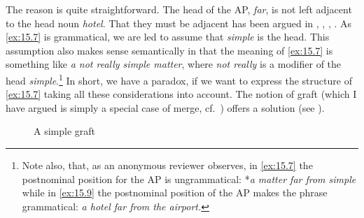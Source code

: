 \documentclass[output=paper]{langsci/langscibook}
\begin{document}
\begin{refcontext}
\label{ex:15.9}
\z
The reason is quite straightforward. The head of the AP, \textit{far}, is not left
adjacent to the head noun \textit{hotel}. That they must be adjacent has been argued
in \citet{Emonds1985,Emonds1976}, \citet{Williams1982},
\citet{VanRiemsdijk1993}, \citet{BibHolRob2014}. As \eqref{ex:15.7} is grammatical, we are
led to assume that \textit{simple} is the head. This assumption also makes sense
semantically in that the meaning of \eqref{ex:15.7} is something like \textit{a not really simple
matter}, where \textit{not really} is a modifier of the head \textit{simple}.\footnote{Note
    also, that, as an anonymous reviewer observes, in \eqref{ex:15.7} the postnominal
    position for the AP is ungrammatical: *\emph{a matter far from simple}
    while in \eqref{ex:15.9} the postnominal position of the AP makes the phrase
grammatical: \emph{a hotel far from the airport.} } In short, we have a
paradox, if we want to express the structure of \eqref{ex:15.7} taking all these
considerations  into account. The notion of graft (which I have argued is
simply a special case of merge, cf.~\cite{VanRiemsdijk2006b}) offers a solution (see ).

\begin{figure}\caption{\label{fig:ex:15.10}A simple graft}
\end{figure}


\end{refcontext}
\end{document}
